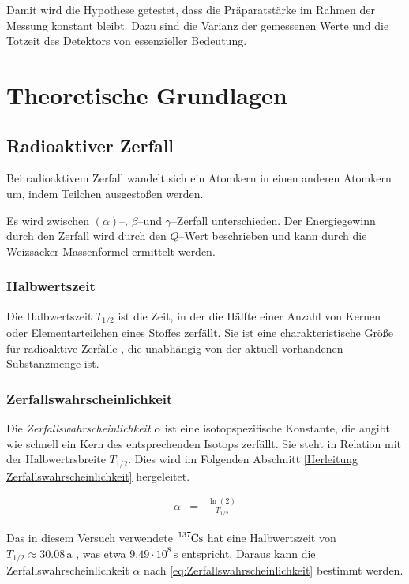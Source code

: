 \documentclass[12pt,a4paper]{scrartcl}
\numberwithin{equation}{section} %
\renewcommand{\[}{} %
\renewcommand{\]}{\noindent} %
\begin{document}
Damit wird die Hypothese getestet, dass die Präparatstärke im Rahmen der
Messung konstant bleibt. Dazu sind die Varianz der gemessenen Werte und
die Totzeit des Detektors von essenzieller Bedeutung.

\clearpage
\hypertarget{theoretische-grundlagen}{%
\section{Theoretische Grundlagen}\label{theoretische-grundlagen}}
\hypertarget{Radioaktiver Zerfall}{\subsection{Radioaktiver Zerfall}\label{Radioaktiver Zerfall}}
Bei radioaktivem Zerfall wandelt sich ein Atomkern in einen anderen Atomkern um, indem Teilchen ausgestoßen werden.

Es wird zwischen $(\alpha)$--, $\beta$--und $\gamma$--Zerfall unterschieden. Der Energiegewinn durch den Zerfall wird durch den $Q$--Wert beschrieben und kann durch die Weizsäcker Massenformel ermittelt werden.

\hypertarget{Halbwertszeit}{\subsubsection{Halbwertszeit}\label{Halbwertszeit}}
Die Halbwertszeit $T_{1/2}$ ist die Zeit, in der die Hälfte einer Anzahl von Kernen oder Elementarteilchen eines Stoffes zerfällt. Sie ist eine charakteristische Größe für radioaktive Zerfälle , die unabhängig von der aktuell vorhandenen Substanzmenge ist. \cite{Halbwertszeit}

\hypertarget{Zerfallswahrscheinlichkeit}{\subsubsection{Zerfallswahrscheinlichkeit}\label{Zerfallswahrscheinlichkeit}}
Die \emph{Zerfallswahrscheinlichkeit} $\alpha$ ist eine isotopspezifische Konstante, die angibt wie schnell ein Kern des entsprechenden Isotops zerfällt. Sie steht in Relation mit der Halbwertrsbreite $T_{1/2}$. Dies wird im Folgenden  Abschnitt \ref{Herleitung Zerfallswahrscheinlichkeit} hergeleitet.

\begin{eqnarray}
	\alpha &=& \frac{\ln{(2)}}{T_{1/2}} \label{eq:Zerfallswahrscheinlichkeit}
\end{eqnarray}

\noindent
Das in diesem Versuch verwendete $\ce{^{137}Cs}$ hat eine Halbwertszeit von $T_{1/2}\approx30.08\mathrm{\,a}$ \cite{Chart of Nuclides}, was etwa $9.49 \cdot 10^8 \mathrm{\,s}$ entspricht. Daraus kann die Zerfallswahrscheinlichkeit $\alpha$ nach \eqref{eq:Zerfallswahrscheinlichkeit} bestimmt werden.
\end{document}
